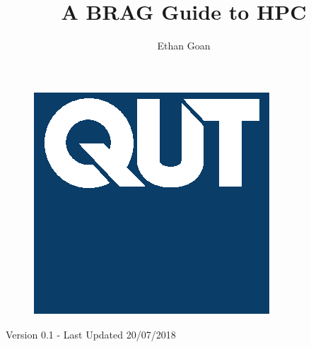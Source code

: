 \documentclass[oneside]{article}
\begin{document}
 
%
\pagestyle{main}
%
%
%
\title{A BRAG Guide to HPC}
\date{}
\author{Ethan Goan}
\maketitle
\begin{figure}[!h]
  \centering
  \includegraphics[scale=0.5]{./figs/qut.eps}
\end{figure}
\begin{center}
  Version 0.1 - Last Updated 20/07/2018
\end{center}
\tableofcontents
%
\newpage
%

%
\newpage

%
%

%
%

%
\newpage

\newpage
%

%
\newpage
\printbibliography
%
%
\end{document}
